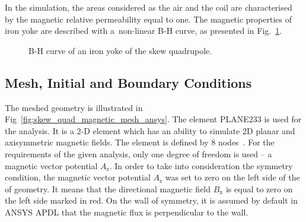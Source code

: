 In the simulation, the areas considered as the air and the coil are characterised by the magnetic relative permeability equal to one. The magnetic properties of iron yoke are described with a~non-linear B-H curve, as presented in Fig.~\ref{fig:b_h_curve}. 

\begin{figure}[H]
    \centering
    \caption{B-H curve of an iron yoke of the skew quadrupole.}
    \label{fig:b_h_curve}
\end{figure}

\subsection{Mesh, Initial and Boundary Conditions}

The meshed geometry is illustrated in Fig~\ref{fig:skew_quad_magnetic_mesh_ansys}. The element PLANE233 is used for the analysis. It is a 2-D element which has an ability to simulate 2D planar and axisymmetric magnetic fields. The element is defined by 8 nodes~\cite{ansys_element_manual}. For the requirements of the given analysis, only one degree of freedom is used -- a magnetic vector potential $A_\text{z}$. In order to take into consideration the symmetry condition, the magnetic vector potential $A_\text{z}$ was set to zero on the left side of the of geometry. It means that the directional magnetic field $B_\text{x}$ is equal to zero on the left side marked in red. On the  wall of symmetry, it is assumed by default in ANSYS APDL that the magnetic flux is perpendicular to the wall.

